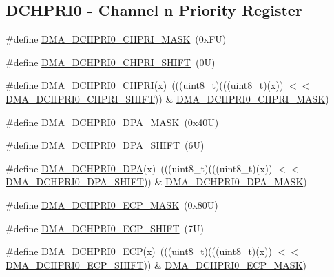 \subsection*{D\+C\+H\+P\+R\+I0 -\/ Channel n Priority Register}
\begin{DoxyCompactItemize}
\item 
\#define \mbox{\hyperlink{group___d_m_a___register___masks_ga5d1b7f82e1bbdb7b8e2f15cb88712022}{D\+M\+A\+\_\+\+D\+C\+H\+P\+R\+I0\+\_\+\+C\+H\+P\+R\+I\+\_\+\+M\+A\+SK}}~(0x\+F\+U)
\item 
\#define \mbox{\hyperlink{group___d_m_a___register___masks_gae28baaa3d91720906d6880186c20f7c0}{D\+M\+A\+\_\+\+D\+C\+H\+P\+R\+I0\+\_\+\+C\+H\+P\+R\+I\+\_\+\+S\+H\+I\+FT}}~(0\+U)
\item 
\#define \mbox{\hyperlink{group___d_m_a___register___masks_ga64abfb2d5a1388fd8e110117715685a6}{D\+M\+A\+\_\+\+D\+C\+H\+P\+R\+I0\+\_\+\+C\+H\+P\+RI}}(x)~(((uint8\+\_\+t)(((uint8\+\_\+t)(x)) $<$$<$ \mbox{\hyperlink{group___d_m_a___register___masks_gae28baaa3d91720906d6880186c20f7c0}{D\+M\+A\+\_\+\+D\+C\+H\+P\+R\+I0\+\_\+\+C\+H\+P\+R\+I\+\_\+\+S\+H\+I\+FT}})) \& \mbox{\hyperlink{group___d_m_a___register___masks_ga5d1b7f82e1bbdb7b8e2f15cb88712022}{D\+M\+A\+\_\+\+D\+C\+H\+P\+R\+I0\+\_\+\+C\+H\+P\+R\+I\+\_\+\+M\+A\+SK}})
\item 
\#define \mbox{\hyperlink{group___d_m_a___register___masks_gad746dcaccbad5591a4c76f397bced727}{D\+M\+A\+\_\+\+D\+C\+H\+P\+R\+I0\+\_\+\+D\+P\+A\+\_\+\+M\+A\+SK}}~(0x40\+U)
\item 
\#define \mbox{\hyperlink{group___d_m_a___register___masks_ga58cc686267da58f32d00143ba6aa5044}{D\+M\+A\+\_\+\+D\+C\+H\+P\+R\+I0\+\_\+\+D\+P\+A\+\_\+\+S\+H\+I\+FT}}~(6\+U)
\item 
\#define \mbox{\hyperlink{group___d_m_a___register___masks_ga9a81ebbe7f8e047140e1a4b0669a459f}{D\+M\+A\+\_\+\+D\+C\+H\+P\+R\+I0\+\_\+\+D\+PA}}(x)~(((uint8\+\_\+t)(((uint8\+\_\+t)(x)) $<$$<$ \mbox{\hyperlink{group___d_m_a___register___masks_ga58cc686267da58f32d00143ba6aa5044}{D\+M\+A\+\_\+\+D\+C\+H\+P\+R\+I0\+\_\+\+D\+P\+A\+\_\+\+S\+H\+I\+FT}})) \& \mbox{\hyperlink{group___d_m_a___register___masks_gad746dcaccbad5591a4c76f397bced727}{D\+M\+A\+\_\+\+D\+C\+H\+P\+R\+I0\+\_\+\+D\+P\+A\+\_\+\+M\+A\+SK}})
\item 
\#define \mbox{\hyperlink{group___d_m_a___register___masks_ga691357e0e7e7aea1147f26d3e7b39ad7}{D\+M\+A\+\_\+\+D\+C\+H\+P\+R\+I0\+\_\+\+E\+C\+P\+\_\+\+M\+A\+SK}}~(0x80\+U)
\item 
\#define \mbox{\hyperlink{group___d_m_a___register___masks_ga77a342f1130e8d8aaccfd88774100b38}{D\+M\+A\+\_\+\+D\+C\+H\+P\+R\+I0\+\_\+\+E\+C\+P\+\_\+\+S\+H\+I\+FT}}~(7\+U)
\item 
\#define \mbox{\hyperlink{group___d_m_a___register___masks_ga1b75052efb763afd1bbebaf39399d694}{D\+M\+A\+\_\+\+D\+C\+H\+P\+R\+I0\+\_\+\+E\+CP}}(x)~(((uint8\+\_\+t)(((uint8\+\_\+t)(x)) $<$$<$ \mbox{\hyperlink{group___d_m_a___register___masks_ga77a342f1130e8d8aaccfd88774100b38}{D\+M\+A\+\_\+\+D\+C\+H\+P\+R\+I0\+\_\+\+E\+C\+P\+\_\+\+S\+H\+I\+FT}})) \& \mbox{\hyperlink{group___d_m_a___register___masks_ga691357e0e7e7aea1147f26d3e7b39ad7}{D\+M\+A\+\_\+\+D\+C\+H\+P\+R\+I0\+\_\+\+E\+C\+P\+\_\+\+M\+A\+SK}})
\end{DoxyCompactItemize}
